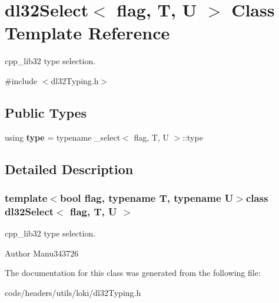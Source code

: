 \hypertarget{classdl32_select}{\section{dl32\-Select$<$ flag, T, U $>$ Class Template Reference}
\label{classdl32_select}
}


cpp\-\_\-lib32 type selection.  




{\ttfamily \#include $<$dl32\-Typing.\-h$>$}

\subsection*{Public Types}
\begin{DoxyCompactItemize}
\item 
\hypertarget{classdl32_select_ae14d372b8220bfd78ba862123f4ce17d}{using {\bfseries type} = typename \-\_\-select$<$ flag, T, U $>$\-::type}\label{classdl32_select_ae14d372b8220bfd78ba862123f4ce17d}

\end{DoxyCompactItemize}


\subsection{Detailed Description}
\subsubsection*{template$<$bool flag, typename T, typename U$>$class dl32\-Select$<$ flag, T, U $>$}

cpp\-\_\-lib32 type selection. 

\begin{DoxyAuthor}{Author}
Manu343726 
\end{DoxyAuthor}


The documentation for this class was generated from the following file\-:\begin{DoxyCompactItemize}
\item 
code/headers/utils/loki/dl32\-Typing.\-h\end{DoxyCompactItemize}
